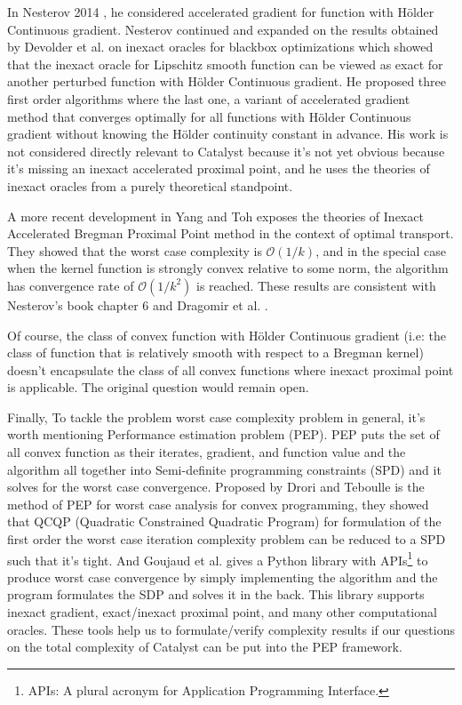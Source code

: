 \documentclass[12pt]{article}
\begin{document}
            In Nesterov 2014 \cite{nesterov_universal_2015}, he considered accelerated gradient for function with Hölder Continuous gradient.
            Nesterov continued and expanded on the results obtained by Devolder et al. \cite{devolder_first-order_2014} on inexact oracles for blackbox optimizations which showed that the inexact oracle for Lipschitz smooth function can be viewed as exact for another perturbed function with Hölder Continuous gradient. 
            He proposed three first order algorithms where the last one, a variant of accelerated gradient method that converges optimally for all functions with Hölder Continuous gradient without knowing the Hölder continuity constant in advance. 
            His work is not considered directly relevant to Catalyst because it's not yet obvious because it's missing an inexact accelerated proximal point, and he uses the theories of inexact oracles from a purely theoretical standpoint. 
            \par
            A more recent development in Yang and Toh \cite{yang_bregman_2022} exposes the theories of Inexact Accelerated Bregman Proximal Point method in the context of optimal transport. 
            They showed that the worst case complexity is $\mathcal O(1/k)$, and in the special case when the kernel function is strongly convex relative to some norm, the algorithm has convergence rate of $\mathcal O(1/k^2)$ is reached. 
            These results are consistent with Nesterov's book chapter 6 \cite{nesterov_lectures_2018} and Dragomir et al. \cite{dragomir_optimal_2022}. 
            \par
            Of course, the class of convex function with Hölder Continuous gradient (i.e: the class of function that is relatively smooth with respect to a Bregman kernel) doesn't encapsulate the class of all convex functions where inexact proximal point is applicable. 
            The original question would remain open. 
            \par
            Finally, To tackle the problem worst case complexity problem in general, it's worth mentioning Performance estimation problem (PEP). 
            PEP puts the set of all convex function as their iterates, gradient, and function value and the algorithm all together into Semi-definite programming constraints (SPD) and it solves for the worst case convergence. 
            Proposed by Drori and Teboulle \cite{drori_performance_2014} is the method of PEP for worst case analysis for convex programming, they showed that QCQP (Quadratic Constrained Quadratic Program) for formulation of the first order the worst case iteration complexity problem can be reduced to a SPD such that it's tight. 
            And Goujaud et al. \cite{goujaud_pepit_2024} gives a Python library with APIs\footnote{APIs: A plural acronym for Application Programming Interface.} to produce worst case convergence by simply implementing the algorithm and the program formulates the SDP and solves it in the back. 
            This library supports inexact gradient, exact/inexact proximal point, and many other computational oracles. 
            These tools help us to formulate/verify complexity results if our questions on the total complexity of Catalyst can be put into the PEP framework. 




\newpage

\appendix
\end{document}

